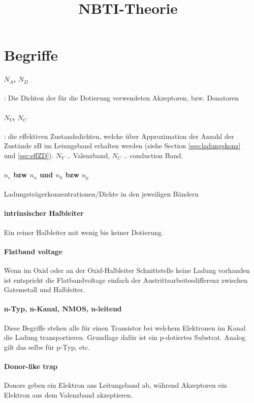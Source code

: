 \documentclass[paper=a4,10pt]{scrartcl}
\begin{document}
\title{NBTI-Theorie}
\section{Begriffe}
\paragraph{$N_A$, $N_D$}: Die Dichten der für die Dotierung verwendeten Akzeptoren, bzw. Donatoren
\paragraph{$N_V$, $N_C$}: die effektiven Zustandsdichten, welche über Approximation der Anzahl der Zustände zB im Leiungsband erhalten werden (siehe Section \ref{seq:ladungskonz} und \ref{sec:effZD}). $N_V$ .. Valenzband, $N_C$ .. conduction Band.
\paragraph{$n_e$ bzw $n_n$ und $n_h$ bzw $n_p$} Ladungsträgerkonzentrationen/Dichte in den jeweiligen Bändern

\paragraph{intrinsischer Halbleiter} Ein reiner Halbleiter mit wenig bis keiner Dotierung. 

\paragraph{Flatband voltage} Wenn im Oxid oder an der Oxid-Halbleiter Schnittstelle keine Ladung vorhanden ist entspricht die Flatbandvoltage einfach der Austrittsarbeitesdifferenz zwischen Gatemetall und Halbleiter.

\paragraph{n-Typ, n-Kanal, NMOS, n-leitend} Diese Begriffe stehen alle für einen Transistor bei welchem Elektronen im Kanal die Ladung transportieren. Grundlage dafür ist ein p-dotiertes Substrat. Analog gilt das selbe für p-Typ, etc. 

\paragraph{Donor-like trap} Donors geben ein Elektron ans Leitungsband ab, während Akzeptoren ein Elektron aus dem Valenzband akzeptieren.
\end{document}
